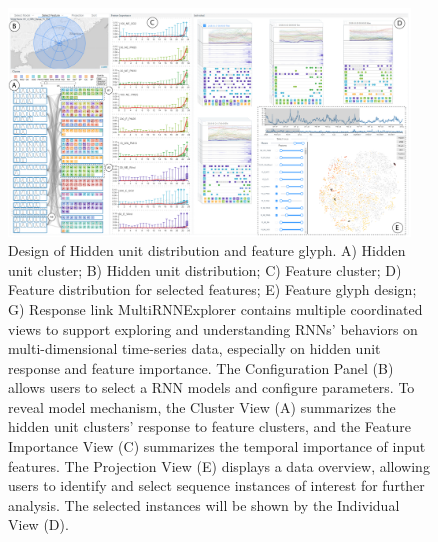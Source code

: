 \begin{figure}[t]
	\centering
	\includegraphics[width=0.95\textwidth]{figure/MultiRNNExplorer/teaser.pdf}
	\vspace{-3mm}
	\caption{Design of Hidden unit distribution and feature glyph. A) Hidden unit cluster; B) Hidden unit distribution; C) Feature cluster; D) Feature distribution for selected features; E) Feature glyph design; G) Response link MultiRNNExplorer contains multiple coordinated views to support exploring and understanding RNNs' behaviors on multi-dimensional time-series data, especially on hidden unit response and feature importance.
		The Configuration Panel (B) allows users to select a RNN models and configure parameters. 
		To reveal model mechanism, the Cluster View (A) summarizes the hidden unit clusters' response to feature clusters, and the Feature Importance View (C) summarizes the temporal importance of input features. 
		The Projection View (E) displays a data overview, allowing users to identify and select sequence instances of interest for further analysis. 
		The selected instances will be shown by the Individual View (D). }
	\label{fig:teaser}
	\vspace{-1mm}
\end{figure}






